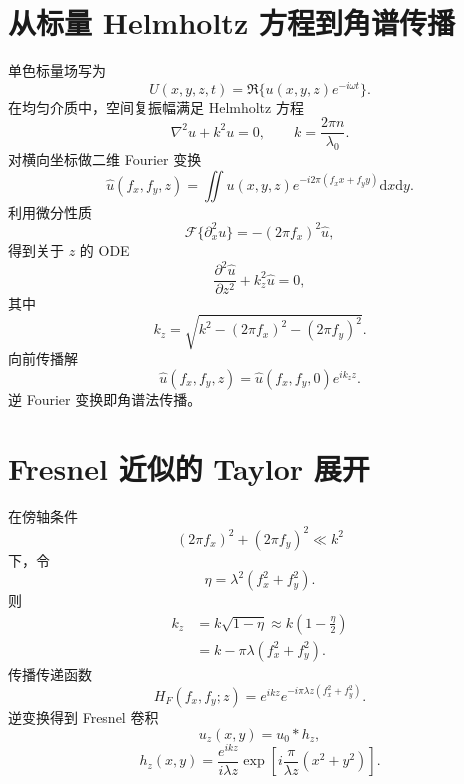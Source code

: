 \documentclass[UTF8,12pt,a4paper,fontset=none]{ctexart}
\numberwithin{equation}{section}
\newcommand{\dd}{\mathrm{d}}
\begin{document}
\section{从标量 Helmholtz 方程到角谱传播}
单色标量场写为
\begin{equation}
 U(x,y,z,t)=\Re\{u(x,y,z)e^{-i\omega t}\}.
\end{equation}
在均匀介质中，空间复振幅满足 Helmholtz 方程
\begin{equation}
 \nabla^2u+k^2u=0,
 \qquad k=\frac{2\pi n}{\lambda_0}.
\end{equation}
对横向坐标做二维 Fourier 变换
\begin{equation}
 \widehat u(f_x,f_y,z)=\iint u(x,y,z)
 e^{-i2\pi(f_xx+f_yy)}\dd x\dd y.
\end{equation}
利用微分性质
\begin{equation}
 \mathcal F\{\partial_x^2u\}=-(2\pi f_x)^2\widehat u,
\end{equation}
得到关于 $z$ 的 ODE
\begin{equation}
 \frac{\partial^2\widehat u}{\partial z^2}
 +k_z^2\widehat u=0,
\end{equation}
其中
\begin{equation}
 k_z=\sqrt{k^2-(2\pi f_x)^2-(2\pi f_y)^2}.
\end{equation}
向前传播解
\begin{equation}
 \boxed{\widehat u(f_x,f_y,z)=
 \widehat u(f_x,f_y,0)e^{ik_zz}.}
\end{equation}
逆 Fourier 变换即角谱法传播。

\section{Fresnel 近似的 Taylor 展开}
在傍轴条件
\begin{equation}
 (2\pi f_x)^2+(2\pi f_y)^2\ll k^2
\end{equation}
下，令
\begin{equation}
 \eta=\lambda^2(f_x^2+f_y^2).
\end{equation}
则
\begin{align}
 k_z
 &=k\sqrt{1-\eta}
 \approx k\left(1-\frac\eta2\right)\\
 &=k-\pi\lambda(f_x^2+f_y^2).
\end{align}
传播传递函数
\begin{equation}
 H_F(f_x,f_y;z)=e^{ikz}
 e^{-i\pi\lambda z(f_x^2+f_y^2)}.
\end{equation}
逆变换得到 Fresnel 卷积
\begin{equation}
 u_z(x,y)=u_0*h_z,
\end{equation}
\begin{equation}
 h_z(x,y)=\frac{e^{ikz}}{i\lambda z}
 \exp\left[i\frac{\pi}{\lambda z}(x^2+y^2)\right].
\end{equation}
\end{document}
